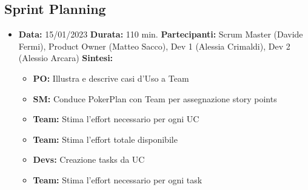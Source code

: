 \documentclass{article}
\begin{document}
    \subsection{Sprint Planning}
    \begin{itemize}
        \item \textbf{Data:} 15/01/2023
        \newline \textbf{Durata:} 110 min.
        \newline \textbf{Partecipanti:} Scrum Master (Davide Fermi), Product Owner (Matteo Sacco), Dev 1 (Alessia Crimaldi), Dev 2 (Alessio Arcara)
        \newline \textbf{Sintesi:}
        \begin{itemize}
            \item \textbf{PO:} Illustra e descrive casi d'Uso a Team
            \item \textbf{SM:} Conduce PokerPlan con Team per assegnazione story points
            \item \textbf{Team:} Stima l'effort necessario per ogni UC
            \item \textbf{Team:} Stima l'effort totale disponibile
            \item \textbf{Devs:} Creazione tasks da UC
            \item \textbf{Team:} Stima l'effort necessario per ogni task
        \end{itemize}



\end{itemize}
\end{document}
